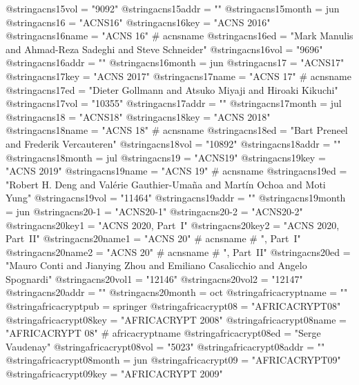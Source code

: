 @string{acns15vol =             "9092"}
@string{acns15addr =            ""}
@string{acns15month =           jun}
@string{acns16 =                "ACNS16"}
@string{acns16key =             "ACNS 2016"}
@string{acns16name =            "ACNS 16" # acnsname}
@string{acns16ed =              "Mark Manulis and Ahmad-Reza Sadeghi and Steve Schneider"}
@string{acns16vol =             "9696"}
@string{acns16addr =            ""}
@string{acns16month =           jun}
@string{acns17 =                "ACNS17"}
@string{acns17key =             "ACNS 2017"}
@string{acns17name =            "ACNS 17" # acnsname}
@string{acns17ed =              "Dieter Gollmann and Atsuko Miyaji and Hiroaki Kikuchi"}
@string{acns17vol =             "10355"}
@string{acns17addr =            ""}
@string{acns17month =           jul}
@string{acns18 =                "ACNS18"}
@string{acns18key =             "ACNS 2018"}
@string{acns18name =            "ACNS 18" # acnsname}
@string{acns18ed =              "Bart Preneel and Frederik Vercauteren"}
@string{acns18vol =             "10892"}
@string{acns18addr =            ""}
@string{acns18month =           jul}
@string{acns19 =                "ACNS19"}
@string{acns19key =             "ACNS 2019"}
@string{acns19name =            "ACNS 19" # acnsname}
@string{acns19ed =              "Robert H. Deng and Val{\'e}rie {Gauthier-Uma{\~n}a} and Mart{\'i}n Ochoa and Moti Yung"}
@string{acns19vol =             "11464"}
@string{acns19addr =            ""}
@string{acns19month =           jun}
@string{acns20-1 =              "ACNS20-1"}
@string{acns20-2 =              "ACNS20-2"}
@string{acns20key1 =            "ACNS 2020, Part~I"}
@string{acns20key2 =            "ACNS 2020, Part~II"}
@string{acns20name1 =           "ACNS 20" # acnsname # ", Part~I"}
@string{acns20name2 =           "ACNS 20" # acnsname # ", Part~II"}
@string{acns20ed =              "Mauro Conti and Jianying Zhou and Emiliano Casalicchio and Angelo Spognardi"}
@string{acns20vol1 =            "12146"}
@string{acns20vol2 =            "12147"}
@string{acns20addr =            ""}
@string{acns20month =           oct}
@string{africacryptname =       ""}
@string{africacryptpub =        springer}
@string{africacrypt08 =         "AFRICACRYPT08"}
@string{africacrypt08key =      "AFRICACRYPT 2008"}
@string{africacrypt08name =     "AFRICACRYPT 08" # africacryptname}
@string{africacrypt08ed =       "Serge Vaudenay"}
@string{africacrypt08vol =      "5023"}
@string{africacrypt08addr =     ""}
@string{africacrypt08month =    jun}
@string{africacrypt09 =         "AFRICACRYPT09"}
@string{africacrypt09key =      "AFRICACRYPT 2009"}
